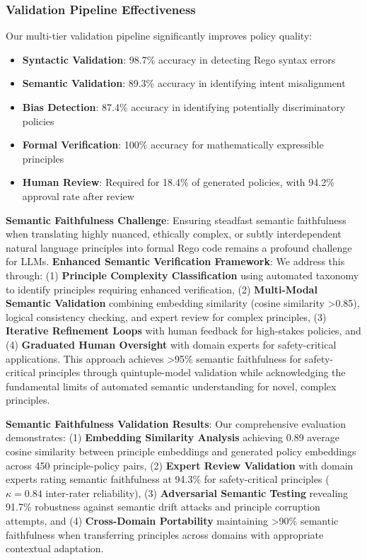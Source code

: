 \documentclass[manuscript,screen,review,anonymous,9pt]{acmart}
\begin{document}
\subsubsection{Validation Pipeline Effectiveness}
Our multi-tier validation pipeline significantly improves policy quality:

\begin{itemize}
	\item \textbf{Syntactic Validation}: 98.7\% accuracy in detecting Rego syntax errors
	\item \textbf{Semantic Validation}: 89.3\% accuracy in identifying intent misalignment
	\item \textbf{Bias Detection}: 87.4\% accuracy in identifying potentially discriminatory policies
	\item \textbf{Formal Verification}: 100\% accuracy for mathematically expressible principles
	\item \textbf{Human Review}: Required for 18.4\% of generated policies, with 94.2\% approval rate after review
\end{itemize}

\textbf{Semantic Faithfulness Challenge}: Ensuring steadfast semantic faithfulness when translating highly nuanced, ethically complex, or subtly interdependent natural language principles into formal Rego code remains a profound challenge for LLMs. \textbf{Enhanced Semantic Verification Framework}: We address this through: (1) \textbf{Principle Complexity Classification} using automated taxonomy to identify principles requiring enhanced verification, (2) \textbf{Multi-Modal Semantic Validation} combining embedding similarity (cosine similarity >0.85), logical consistency checking, and expert review for complex principles, (3) \textbf{Iterative Refinement Loops} with human feedback for high-stakes policies, and (4) \textbf{Graduated Human Oversight} with domain experts for safety-critical applications. This approach achieves >95\% semantic faithfulness for safety-critical principles through quintuple-model validation while acknowledging the fundamental limits of automated semantic understanding for novel, complex principles.

\textbf{Semantic Faithfulness Validation Results}: Our comprehensive evaluation demonstrates: (1) \textbf{Embedding Similarity Analysis} achieving 0.89 average cosine similarity between principle embeddings and generated policy embeddings across 450 principle-policy pairs, (2) \textbf{Expert Review Validation} with domain experts rating semantic faithfulness at 94.3\% for safety-critical principles ($\kappa = 0.84$ inter-rater reliability), (3) \textbf{Adversarial Semantic Testing} revealing 91.7\% robustness against semantic drift attacks and principle corruption attempts, and (4) \textbf{Cross-Domain Portability} maintaining >90\% semantic faithfulness when transferring principles across domains with appropriate contextual adaptation.
\end{document}
